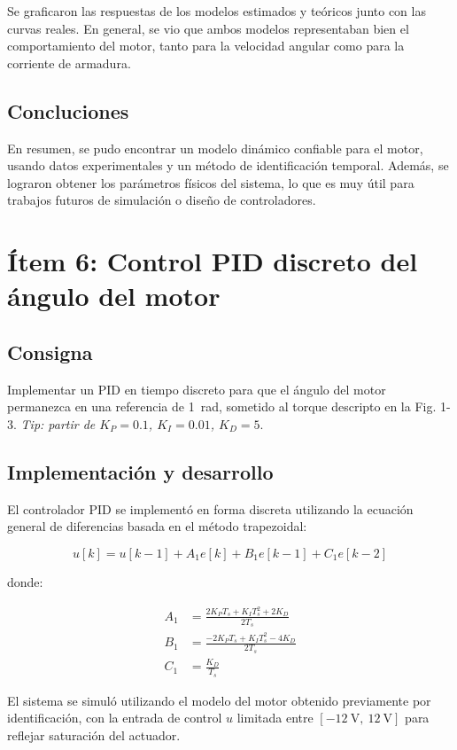 \documentclass{article}
\begin{document}
Se graficaron las respuestas de los modelos estimados y teóricos junto con las curvas reales. En general, se vio que ambos modelos representaban bien el comportamiento del motor, tanto para la velocidad angular como para la corriente de armadura.

\subsection*{Concluciones}
En resumen, se pudo encontrar un modelo dinámico confiable para el motor, usando datos experimentales y un método de identificación temporal. Además, se lograron obtener los parámetros físicos del sistema, lo que es muy útil para trabajos futuros de simulación o diseño de controladores.


\section{Ítem 6: Control PID discreto del ángulo del motor}

\subsection*{Consigna}
Implementar un PID en tiempo discreto para que el ángulo del motor permanezca en una referencia de 1~rad, sometido al torque descripto en la Fig. 1-3. \emph{Tip: partir de $K_P = 0.1$, $K_I = 0.01$, $K_D = 5$}.

\subsection*{Implementación y desarrollo}

El controlador PID se implementó en forma discreta utilizando la ecuación general de diferencias basada en el método trapezoidal:

\[
u[k] = u[k{-}1] + A_1 e[k] + B_1 e[k{-}1] + C_1 e[k{-}2]
\]

donde:

\begin{align*}
A_1 &= \frac{2K_P T_s + K_I T_s^2 + 2K_D}{2T_s} \\
B_1 &= \frac{-2K_P T_s + K_I T_s^2 - 4K_D}{2T_s} \\
C_1 &= \frac{K_D}{T_s}
\end{align*}

El sistema se simuló utilizando el modelo del motor obtenido previamente por identificación, con la entrada de control $u$ limitada entre $[-12\ \text{V},\ 12\ \text{V}]$ para reflejar saturación del actuador.
\end{document}
